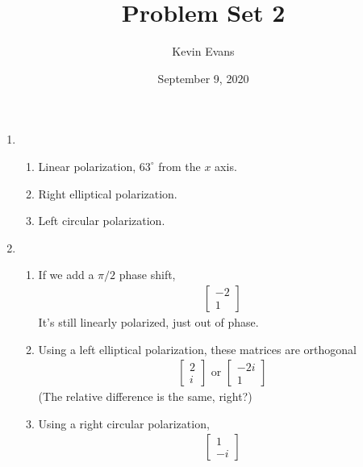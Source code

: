 \documentclass{homework}
\title{Problem Set 2}
\author{Kevin Evans}
\date{September 9, 2020}
\begin{document}
	\maketitle
	
	\begin{enumerate}
		\item \begin{enumerate}
			\item Linear polarization, $63^\circ$ from the $x$ axis.
			\item Right elliptical polarization.
			\item Left circular polarization.
		\end{enumerate}
	
		\item \begin{enumerate}
			\item If we add a $\pi/2$ phase shift, \begin{align*}
				\left[ \begin{matrix}
					-2 \\ 1
				\end{matrix} \right]
			\end{align*}
			It's still linearly polarized, just out of phase.
			
			\item Using a left elliptical polarization, these matrices are orthogonal \begin{align*}
				\left[
				\begin{matrix}
					2 \\ i				
				\end{matrix}
				\right] \text{ or } \left[
					\begin{matrix}
						-2i \\ 1
					\end{matrix}
				\right]
			\end{align*}
			(The relative difference is the same, right?)
			
			\item Using a right circular polarization, \begin{align*}
				\left[
					\begin{matrix}
						1 \\ -i
					\end{matrix}
				\right]
			\end{align*}
		\end{enumerate}
	

\end{enumerate}
\end{document}
